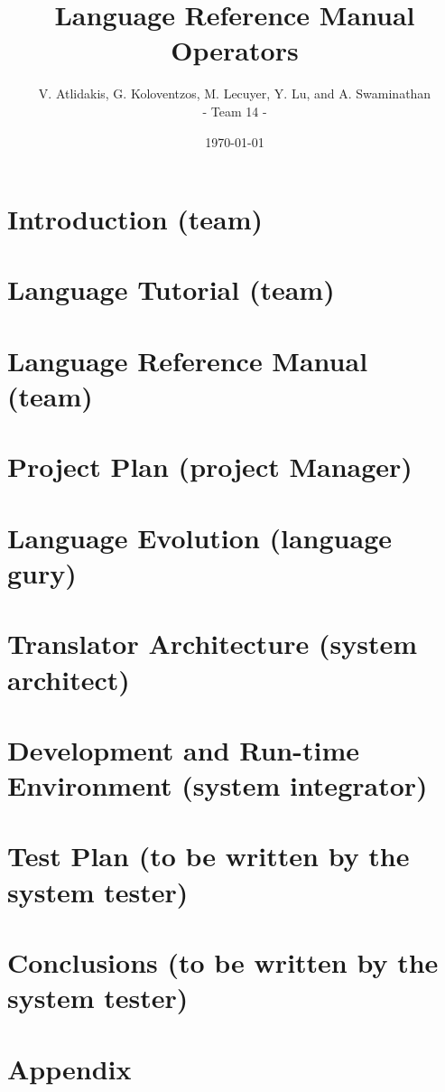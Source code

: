 \documentclass[12pt]{report}
\title{Language Reference Manual Operators}
\author{V. Atlidakis, G. Koloventzos, M. Lecuyer, Y. Lu, and A. Swaminathan \\ - Team 14 -}
\date{\today}
\begin{document}
\maketitle
\tableofcontents
\newpage
\chapter{Introduction (team)}

\chapter{Language Tutorial (team)}

\chapter{Language Reference Manual (team)}

\chapter{Project Plan (project Manager)}

\chapter{Language Evolution (language gury)}

\chapter{Translator Architecture (system architect)}

\chapter{Development and Run-time Environment (system integrator)}

\chapter{Test Plan (to be written by the system tester)}

\chapter{Conclusions (to be written by the system tester)}

\chapter{Appendix}

\end{document}
